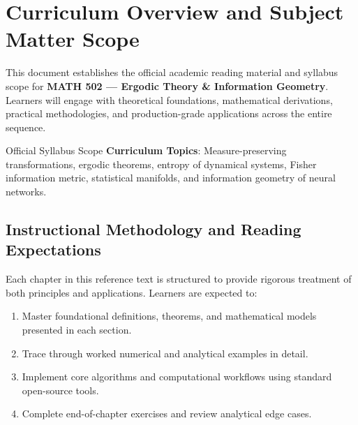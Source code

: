 \section{Curriculum Overview and Subject Matter Scope}

This document establishes the official academic reading material and syllabus scope for \textbf{MATH 502 --- Ergodic Theory \& Information Geometry}. Learners will engage with theoretical foundations, mathematical derivations, practical methodologies, and production-grade applications across the entire sequence.

\begin{InsightBox}{Official Syllabus Scope}
  \textbf{Curriculum Topics}: Measure-preserving transformations, ergodic theorems, entropy of dynamical systems, Fisher information metric, statistical manifolds, and information geometry of neural networks.
\end{InsightBox}

\subsection{Instructional Methodology and Reading Expectations}

Each chapter in this reference text is structured to provide rigorous treatment of both principles and applications. Learners are expected to:
\begin{enumerate}
  \item Master foundational definitions, theorems, and mathematical models presented in each section.
  \item Trace through worked numerical and analytical examples in detail.
  \item Implement core algorithms and computational workflows using standard open-source tools.
  \item Complete end-of-chapter exercises and review analytical edge cases.
\end{enumerate}

